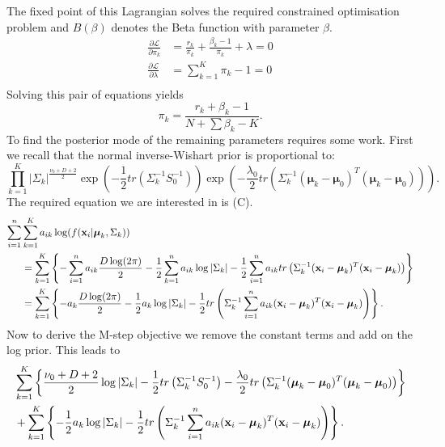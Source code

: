 \documentclass[12pt,english]{article}\usepackage[]{graphicx}\usepackage[]{color}
\begin{document}
The fixed point of this Lagrangian solves the required constrained optimisation problem and $B(\beta)$ denotes the Beta function with parameter $\beta$.
\begin{equation}
\begin{split}
\frac{\partial\mathcal{L}}{\partial \pi_k} &= \frac{r_k}{\pi_k} + \frac{\beta_k - 1}{\pi_k} + \lambda = 0\\
\frac{\partial\mathcal{L}}{\partial \lambda} &= \sum_{k=1}^{K}\pi_k - 1 = 0\\
\end{split}
\end{equation}
Solving this pair of equations yields
\begin{equation}
\pi_k = \frac{r_k + \beta_k - 1}{N + \sum \beta_k - K}.
\end{equation}
To find the posterior mode of the remaining parameters requires some work.
First we recall that the normal inverse-Wishart prior is proportional to:
\begin{equation}
\prod_{k=1}^{K}|\Sigma_{k}|^{\frac{\nu_0 + D + 2}{2}}\exp \left(-\frac{1}{2}tr(\Sigma_{k}^{-1}S_0^{-1})\right)\exp \left(-\frac{\lambda_0}{2}tr(\Sigma_{k}^{-1}(\boldsymbol{\mu}_k - \boldsymbol{\mu}_0)^{T}(\boldsymbol{\mu}_k - \boldsymbol{\mu}_0))\right).
\end{equation}
The required equation we are interested in is (C).
\begin{equation}
\begin{split}
\sum_{i=1}^{n} &\sum_{k=1}^{K}a_{ik}\log (f({\bf x}_i|\boldsymbol{\mu}_k, \Sigma_k))\\
& = \sum_{k=1}^{K}\left\{- \sum_{i=1}^{n} a_{ik}\frac{D\log(2\pi)}{2} - \frac{1}{2}\sum_{k=1}^{n}a_{ik}\log|\Sigma_{k}| - \frac{1}{2}\sum_{i=1}^{n}a_{ik}tr\left(\Sigma_{k}^{-1}({\bf x}_i - \boldsymbol{\mu}_k)^{T}({\bf x}_i - \boldsymbol{\mu}_k)\right)\right\}\\
& = \sum_{k=1}^{K}\left\{- a_k\frac{D\log(2\pi)}{2} - \frac{1}{2}a_k\log|\Sigma_{k}| - \frac{1}{2}tr\left(\Sigma_{k}^{-1}\sum_{i=1}^{n}a_{ik}({\bf x}_i - \boldsymbol{\mu}_k)^{T}({\bf x}_i - \boldsymbol{\mu}_k)\right)\right\}.
\end{split}
\end{equation}
Now to derive the M-step objective we remove the constant terms and add on the log prior. This leads to
\begin{equation}
\begin{split}
 &\sum_{k=1}^{K} \left\{\frac{\nu_0 + D + 2 }{2} \log|\Sigma_k|  - \frac{1}{2} tr \left(\Sigma_{k}^{-1} S_0^{-1}\right) - \frac{\lambda_0}{2} tr \left( \Sigma_{k}^{-1}(\boldsymbol{\mu}_k - \boldsymbol{\mu}_0)^T(\boldsymbol{\mu}_k - \boldsymbol{\mu}_0) \right)\right\} \\
 & + \sum_{k=1}^{K} \left\{- \frac{1}{2}a_k\log|\Sigma_{k}| - \frac{1}{2} tr\left(\Sigma_{k}^{-1}\sum_{i=1}^{n}a_{ik}({\bf x}_i - \boldsymbol{\mu}_k)^{T}({\bf x}_i - \boldsymbol{\mu}_k)\right) \right\}.
\end{split}
\end{equation}
\end{document}
